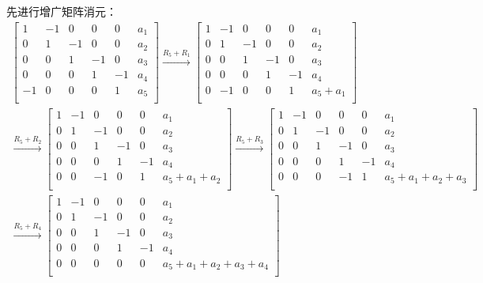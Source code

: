 \documentclass{article}
\begin{document}
先进行增广矩阵消元：
\begin{align*}
  \begin{bmatrix}
    1  & -1 & 0  & 0  & 0  & a_1 \\
    0  & 1  & -1 & 0  & 0  & a_2 \\
    0  & 0  & 1  & -1 & 0  & a_3 \\
    0  & 0  & 0  & 1  & -1 & a_4 \\
    -1 & 0  & 0  & 0  & 1  & a_5 \\
  \end{bmatrix}
  \xrightarrow{R_5 + R_1}
  \begin{bmatrix}
    1 & -1 & 0  & 0  & 0  & a_1       \\
    0 & 1  & -1 & 0  & 0  & a_2       \\
    0 & 0  & 1  & -1 & 0  & a_3       \\
    0 & 0  & 0  & 1  & -1 & a_4       \\
    0 & -1 & 0  & 0  & 1  & a_5 + a_1 \\
  \end{bmatrix}                   \\
  \xrightarrow{R_5 + R_2}
  \begin{bmatrix}
    1 & -1 & 0  & 0  & 0  & a_1             \\
    0 & 1  & -1 & 0  & 0  & a_2             \\
    0 & 0  & 1  & -1 & 0  & a_3             \\
    0 & 0  & 0  & 1  & -1 & a_4             \\
    0 & 0  & -1 & 0  & 1  & a_5 + a_1 + a_2 \\
  \end{bmatrix}
  \xrightarrow{R_5 + R_3}
  \begin{bmatrix}
    1 & -1 & 0  & 0  & 0  & a_1                   \\
    0 & 1  & -1 & 0  & 0  & a_2                   \\
    0 & 0  & 1  & -1 & 0  & a_3                   \\
    0 & 0  & 0  & 1  & -1 & a_4                   \\
    0 & 0  & 0  & -1 & 1  & a_5 + a_1 + a_2 + a_3 \\
  \end{bmatrix}       \\
  \xrightarrow{R_5 + R_4}
  \begin{bmatrix}
    1 & -1 & 0  & 0  & 0  & a_1                         \\
    0 & 1  & -1 & 0  & 0  & a_2                         \\
    0 & 0  & 1  & -1 & 0  & a_3                         \\
    0 & 0  & 0  & 1  & -1 & a_4                         \\
    0 & 0  & 0  & 0  & 0  & a_5 + a_1 + a_2 + a_3 + a_4 \\
  \end{bmatrix} \\
\end{align*}
\end{document}
